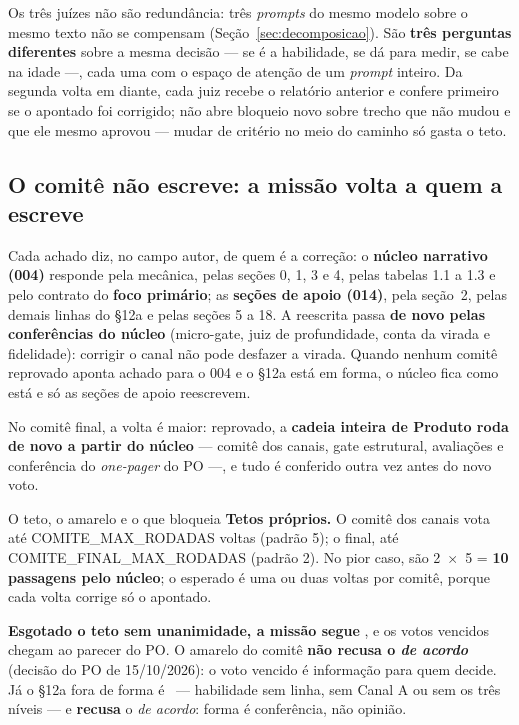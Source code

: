 \documentclass[11pt,a4paper]{article}
\newcommand{\cod}[1]{{\ttfamily\small #1}}
\newcommand{\bolinha}[1]{\tikz[baseline=-0.5ex]{\fill[#1] (0,0) circle (0.33em);}}
\newcommand{\statusAmbar}{\bolinha{sinalAmbar}}
\newcommand{\statusVermelho}{\bolinha{sinalVermelho}}
\begin{document}
Os três juízes não são redundância: três \emph{prompts} do mesmo modelo sobre o mesmo texto não se compensam (Seção~\ref{sec:decomposicao}). São \textbf{três perguntas diferentes} sobre a mesma decisão --- se é a habilidade, se dá para medir, se cabe na idade ---, cada uma com o espaço de atenção de um \emph{prompt} inteiro. Da segunda volta em diante, cada juiz recebe o relatório anterior e confere primeiro se o apontado foi corrigido; não abre bloqueio novo sobre trecho que não mudou e que ele mesmo aprovou --- mudar de critério no meio do caminho só gasta o teto.

\subsection{O comitê não escreve: a missão volta a quem a escreve}

Cada achado diz, no campo \cod{autor}, de quem é a correção: o \textbf{núcleo narrativo (004)} responde pela mecânica, pelas seções 0, 1, 3 e 4, pelas tabelas 1.1 a 1.3 e pelo contrato do \textbf{foco primário}; as \textbf{seções de apoio (014)}, pela seção~2, pelas demais linhas do \S12a e pelas seções 5 a 18. A reescrita passa \textbf{de novo pelas conferências do núcleo} (micro-gate, juiz de profundidade, conta da virada e fidelidade): corrigir o canal não pode desfazer a virada. Quando nenhum comitê reprovado aponta achado para o 004 e o \S12a está em forma, o núcleo fica como está e só as seções de apoio reescrevem.

No comitê final, a volta é maior: reprovado, a \textbf{cadeia inteira de Produto roda de novo a partir do núcleo} --- comitê dos canais, gate estrutural, avaliações e conferência do \emph{one-pager} do PO ---, e tudo é conferido outra vez antes do novo voto.

\begin{caixaGuardrail}{O teto, o amarelo e o que bloqueia}
\textbf{Tetos próprios.} O comitê dos canais vota até \cod{COMITE\_MAX\_RODADAS} voltas (padrão 5); o final, até \cod{COMITE\_FINAL\_MAX\_RODADAS} (padrão 2). No pior caso, são 2~$\times$~5 = \textbf{10 passagens pelo núcleo}; o esperado é uma ou duas voltas por comitê, porque cada volta corrige só o apontado.

\textbf{Esgotado o teto sem unanimidade, a missão segue \statusAmbar}, e os votos vencidos chegam ao parecer do PO. O amarelo do comitê \textbf{não recusa o \emph{de acordo}} (decisão do PO de 15/10/2026): o voto vencido é informação para quem decide. Já o \S12a fora de forma é \statusVermelho\ --- habilidade sem linha, sem Canal A ou sem os três níveis --- e \textbf{recusa} o \emph{de acordo}: forma é conferência, não opinião.
\end{caixaGuardrail}
\end{document}
